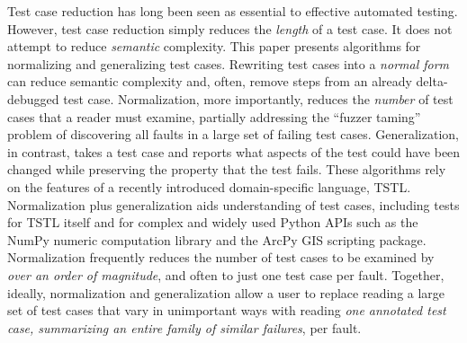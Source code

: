 Test case reduction has long been seen as essential to effective automated testing.  However, test case reduction simply reduces the \emph{length} of a test case.  It does not attempt to reduce \emph{semantic} complexity.  This paper presents algorithms for normalizing and generalizing test cases.  Rewriting test cases into a \emph{normal form} can reduce semantic complexity and, often, remove steps from an already delta-debugged test case.  Normalization, more importantly, reduces the \emph{number} of test cases that a reader must examine, partially addressing the ``fuzzer taming'' problem of discovering all faults in a large set of failing test cases.  Generalization, in contrast, takes a test case and reports what aspects of the test could have been changed while preserving the property that the test fails.  These algorithms rely on the features of a recently introduced domain-specific language, TSTL.  Normalization plus generalization aids understanding of test cases, including tests for TSTL itself and for complex and widely used Python APIs such as the NumPy numeric computation library and the ArcPy GIS scripting package.  Normalization frequently reduces the number of test cases to be examined by \emph{over an order of magnitude}, and often to just one test case per fault.  Together, ideally, normalization and generalization allow a user to replace reading a large set of test cases that vary in unimportant ways with reading \emph{one annotated test case, summarizing an entire family of similar failures}, per fault. 